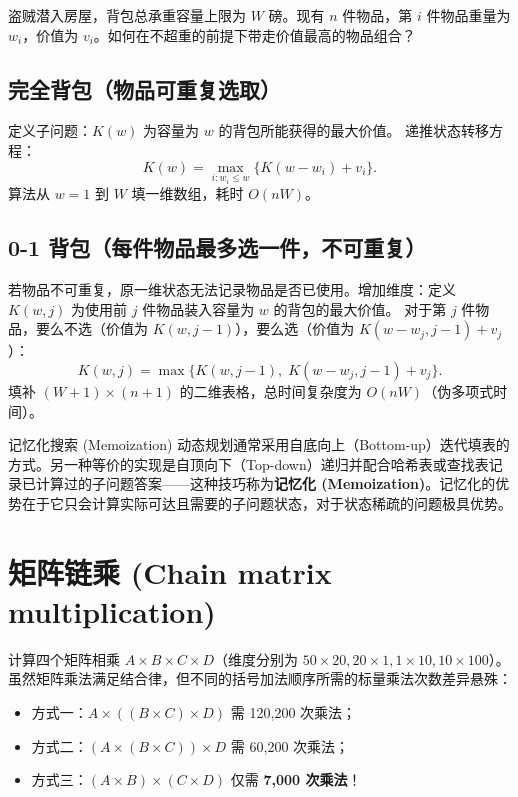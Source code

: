 盗贼潜入房屋，背包总承重容量上限为 $W$ 磅。现有 $n$ 件物品，第 $i$ 件物品重量为 $w_i$，价值为 $v_i$。如何在不超重的前提下带走价值最高的物品组合？

\subsection{完全背包（物品可重复选取）}
定义子问题：$K(w)$ 为容量为 $w$ 的背包所能获得的最大价值。
递推状态转移方程：
\[
K(w) = \max_{i : w_i \le w} \{K(w - w_i) + v_i\}.
\]
算法从 $w = 1$ 到 $W$ 填一维数组，耗时 $O(nW)$。

\subsection{0-1 背包（每件物品最多选一件，不可重复）}
若物品不可重复，原一维状态无法记录物品是否已使用。增加维度：定义 $K(w, j)$ 为使用前 $j$ 件物品装入容量为 $w$ 的背包的最大价值。
对于第 $j$ 件物品，要么不选（价值为 $K(w, j - 1)$），要么选（价值为 $K(w - w_j, j - 1) + v_j$）：
\[
K(w, j) = \max \{K(w, j - 1),\; K(w - w_j, j - 1) + v_j\}.
\]
填补 $(W + 1) \times (n + 1)$ 的二维表格，总时间复杂度为 $O(nW)$（伪多项式时间）。

\begin{sidebarbox}{记忆化搜索 (Memoization)}
动态规划通常采用自底向上（Bottom-up）迭代填表的方式。另一种等价的实现是自顶向下（Top-down）递归并配合哈希表或查找表记录已计算过的子问题答案——这种技巧称为\textbf{记忆化 (Memoization)}。记忆化的优势在于它只会计算实际可达且需要的子问题状态，对于状态稀疏的问题极具优势。
\end{sidebarbox}

\section{矩阵链乘 (Chain matrix multiplication)}

计算四个矩阵相乘 $A \times B \times C \times D$（维度分别为 $50 \times 20, 20 \times 1, 1 \times 10, 10 \times 100$）。
虽然矩阵乘法满足结合律，但不同的括号加法顺序所需的标量乘法次数差异悬殊：
\begin{itemize}
    \item 方式一：$A \times ((B \times C) \times D)$ 需 120,200 次乘法；
    \item 方式二：$(A \times (B \times C)) \times D$ 需 60,200 次乘法；
    \item 方式三：$(A \times B) \times (C \times D)$ 仅需 \textbf{7,000 次乘法}！
\end{itemize}

